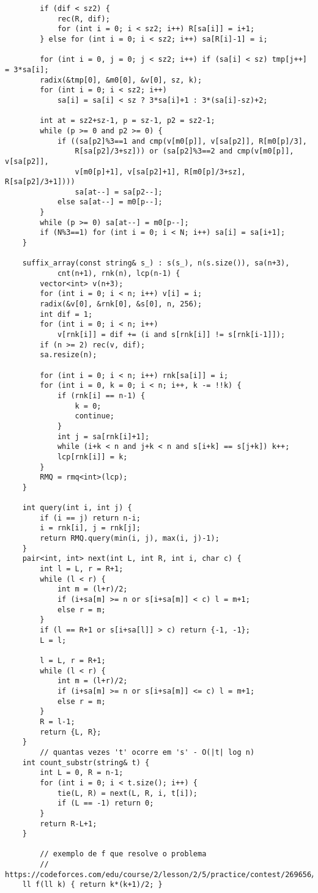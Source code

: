 \documentclass[11pt, a4paper, twoside]{article}
\begin{document}
\begin{verbatim}
		if (dif < sz2) {
			rec(R, dif);
			for (int i = 0; i < sz2; i++) R[sa[i]] = i+1;
		} else for (int i = 0; i < sz2; i++) sa[R[i]-1] = i;
    
		for (int i = 0, j = 0; j < sz2; i++) if (sa[i] < sz) tmp[j++] = 3*sa[i];
		radix(&tmp[0], &m0[0], &v[0], sz, k);
		for (int i = 0; i < sz2; i++)
			sa[i] = sa[i] < sz ? 3*sa[i]+1 : 3*(sa[i]-sz)+2;
    
		int at = sz2+sz-1, p = sz-1, p2 = sz2-1;
		while (p >= 0 and p2 >= 0) {
			if ((sa[p2]%3==1 and cmp(v[m0[p]], v[sa[p2]], R[m0[p]/3],
				R[sa[p2]/3+sz])) or (sa[p2]%3==2 and cmp(v[m0[p]], v[sa[p2]],
				v[m0[p]+1], v[sa[p2]+1], R[m0[p]/3+sz], R[sa[p2]/3+1])))
				sa[at--] = sa[p2--];
			else sa[at--] = m0[p--];
		}
		while (p >= 0) sa[at--] = m0[p--];
		if (N%3==1) for (int i = 0; i < N; i++) sa[i] = sa[i+1];
	}
    
	suffix_array(const string& s_) : s(s_), n(s.size()), sa(n+3),
			cnt(n+1), rnk(n), lcp(n-1) {
		vector<int> v(n+3);
		for (int i = 0; i < n; i++) v[i] = i;
		radix(&v[0], &rnk[0], &s[0], n, 256);
		int dif = 1;
		for (int i = 0; i < n; i++)
			v[rnk[i]] = dif += (i and s[rnk[i]] != s[rnk[i-1]]);
		if (n >= 2) rec(v, dif);
		sa.resize(n);
    
		for (int i = 0; i < n; i++) rnk[sa[i]] = i;
		for (int i = 0, k = 0; i < n; i++, k -= !!k) {
			if (rnk[i] == n-1) {
				k = 0;
				continue;
			}
			int j = sa[rnk[i]+1];
			while (i+k < n and j+k < n and s[i+k] == s[j+k]) k++;
			lcp[rnk[i]] = k;
		}
		RMQ = rmq<int>(lcp);
	}
    
	int query(int i, int j) {
		if (i == j) return n-i;
		i = rnk[i], j = rnk[j];
		return RMQ.query(min(i, j), max(i, j)-1);
	}
	pair<int, int> next(int L, int R, int i, char c) {
		int l = L, r = R+1;
		while (l < r) {
			int m = (l+r)/2;
			if (i+sa[m] >= n or s[i+sa[m]] < c) l = m+1;
			else r = m;
		}
		if (l == R+1 or s[i+sa[l]] > c) return {-1, -1};
		L = l;
    
		l = L, r = R+1;
		while (l < r) {
			int m = (l+r)/2;
			if (i+sa[m] >= n or s[i+sa[m]] <= c) l = m+1;
			else r = m;
		}
		R = l-1;
		return {L, R};
	}
    	// quantas vezes 't' ocorre em 's' - O(|t| log n)
	int count_substr(string& t) {
		int L = 0, R = n-1;
		for (int i = 0; i < t.size(); i++) {
			tie(L, R) = next(L, R, i, t[i]);
			if (L == -1) return 0;
		}
		return R-L+1;
	}
    
    	// exemplo de f que resolve o problema
    	// https://codeforces.com/edu/course/2/lesson/2/5/practice/contest/269656/problem/D
	ll f(ll k) { return k*(k+1)/2; }
    

\end{verbatim}
\end{document}
